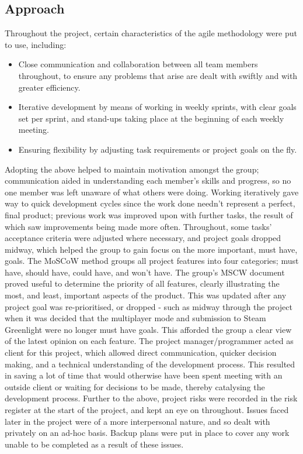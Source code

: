 \documentclass[12pt]{article}
\begin{document}
\subsection{Approach}
Throughout the project, certain characteristics of the agile methodology were put to use, including:
\begin{itemize}
	\item Close communication and collaboration between all team members throughout, to ensure any problems that arise are dealt with swiftly and with greater efficiency.
	\item Iterative development by means of working in weekly sprints, with clear goals set per sprint, and stand-ups taking place at the beginning of each weekly meeting.
	\item Ensuring flexibility by adjusting task requirements or project goals on the fly. 
\end{itemize}
Adopting the above helped to maintain motivation amongst the group; communication aided in understanding each member's skills and progress, so no one member was left unaware of what others were doing. Working iteratively gave way to quick development cycles since the work done needn't represent a perfect, final product; previous work was improved upon with further tasks, the result of which saw improvements being made more often. Throughout, some tasks' acceptance criteria were adjusted where necessary, and project goals dropped midway, which helped the group to gain focus on the more important, must have, goals.  
\newline
\newline
The MoSCoW method groups all project features into four categories; must have, should have, could have, and won't have. The group's MSCW document proved useful to determine the priority of all features, clearly illustrating the most, and least, important aspects of the product. This was updated after any project goal was re-prioritised, or dropped - such as midway through the project when it was decided that the multiplayer mode and submission to Steam Greenlight were no longer must have goals. This afforded the group a clear view of the latest opinion on each feature. 
\newline
\newline
The project manager/programmer acted as client for this project, which allowed direct communication, quicker decision making, and a technical understanding of the development process. This resulted in saving a lot of time that would otherwise have been spent meeting with an outside client or waiting for decisions to be made, thereby catalysing the development process.
\newline 
\newline
Further to the above, project risks were recorded in the risk register at the start of the project, and kept an eye on throughout. Issues faced later in the project were of a more interpersonal nature, and so dealt with privately on an ad-hoc basis. Backup plans were put in place to cover any work unable to be completed as a result of these issues. 
\end{document}
